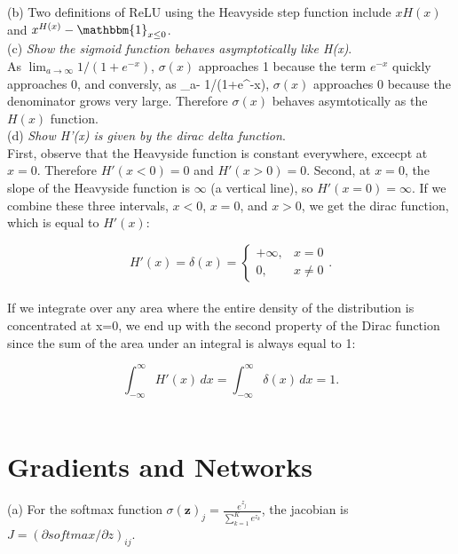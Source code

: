 \documentclass{amsart}
\theoremstyle{definition}
\theoremstyle{remark}
\numberwithin{equation}{section}
\begin{document}
(b) Two definitions of ReLU using the Heavyside step function include
$xH(x)$ and $x^{H(x)}-\mathbbm{1}_{x\leq0} $. \\

(c) \textit{Show the sigmoid function behaves asymptotically like H(x)}. \\

As $\lim_{a\rightarrow\infty} 1/(1+e^{-x})$, $\sigma(x)$ approaches 1 because
the term $e^{-x}$ quickly approaches 0, and conversly, as
\lim_{a\rightarrow-\infty} 1/(1+e^{-x}),  $\sigma(x)$ approaches 0 because the
denominator grows very large. Therefore $\sigma(x)$ behaves asymtotically as the
$H(x)$ function. \\

(d) \textit{Show H'(x) is given by the dirac delta function}. \\

First, observe that the Heavyside function is constant everywhere, excecpt at
$x = 0$. Therefore $H'(x<0) = 0$ and $H'(x>0) = 0$. Second, at $x = 0$, the
slope of the Heavyside function is $\infty$ (a vertical line), so $H'(x=0) =
\infty$. If we combine these three intervals, $x<0$, $x=0$, and $x>0$, we get
the dirac function, which is equal to $H'(x)$:

\begin{equation}
H'(x) = \delta(x) = \begin{cases} +\infty, & x = 0 \\ 0, & x \ne 0 \end{cases}.
\end{equation} \\

If we integrate over any area where the entire density of the distribution is
concentrated at x=0, we end up with the second property of the Dirac function
since the sum of the area under an integral is always equal to 1:

\begin{equation}
\int_{-\infty}^\infty H'(x) \, dx = \int_{-\infty}^\infty \delta(x) \, dx = 1.
\end{equation} \\


\section{Gradients and Networks}

(a) For the softmax function $\sigma(\mathbf{z})_j = \frac{e^{z_j}}{\sum_{k=1}^K e^{z_k}}$,
the jacobian is $J = (\partial softmax/\partial z)_{ij}$.
\end{document}
